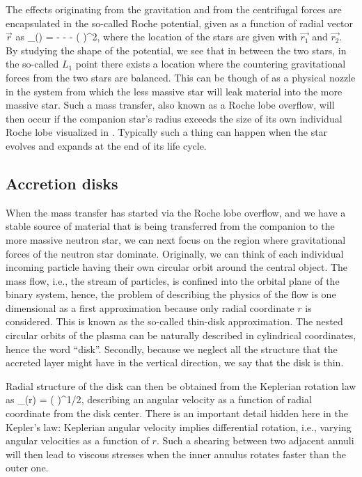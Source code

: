 The effects originating from the gravitation and from the centrifugal forces are encapsulated in the so-called Roche potential, given as a function of radial vector $\vec{r}$ as\cite[see e.g.,][]{PRP02, LL15}
\be
\Phi_{}() = - - -  ( \vec{ \omega } \times {} )^2,
\ee
where the location of the stars are given with $\vec{r_1}$ and $\vec{r_2}$.
By studying the shape of the potential, we see that in between the two stars, in the so-called $L_1$ point there exists a location where the countering gravitational forces from the two stars are balanced.
This can be though of as a physical nozzle in the system from which the less massive star will leak material into the more massive star.
Such a mass transfer, also known as a Roche lobe overflow, will then occur if the companion star's radius exceeds the size of its own individual Roche lobe visualized in .
Typically such a thing can happen when the star evolves and expands at the end of its life cycle. 


\subsection{Accretion disks}

When the mass transfer has started via the Roche lobe overflow, and we have a stable source of material that is being transferred from the companion to the more massive neutron star, we can next focus on the region where gravitational forces of the neutron star dominate.
Originally, we can think of each individual incoming particle having their own circular orbit around the central object.
The mass flow, i.e., the stream of particles, is confined into the orbital plane of the binary system, hence, the problem of describing the physics of the flow is one dimensional as a first approximation because only radial coordinate $r$ is considered.
This is known as the so-called thin-disk approximation.
The nested circular orbits of the plasma can be naturally described in cylindrical coordinates, hence the word ``disk''.
Secondly, because we neglect all the structure that the accreted layer might have in the vertical direction, we say that the disk is thin.

Radial structure of the disk can then be obtained from the Keplerian rotation law as
\be
\Omega_{}(r) = \left(  \right)^{1/2},
\ee
describing an angular velocity as a function of radial coordinate from the disk center.
There is an important detail hidden here in the Kepler's law:
Keplerian angular velocity implies differential rotation, i.e., varying angular velocities as a function of $r$.
Such a shearing between two adjacent annuli will then lead to viscous stresses when the inner annulus rotates faster than the outer one.


